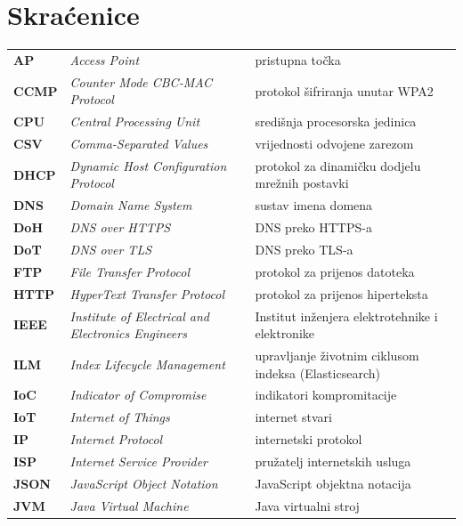 \documentclass[diplomskirad]{fer}
\renewcommand\thepage{}
\begin{document}
\tableofcontents
\newpage
\mainmatter
\setcounter{page}{1}
\renewcommand\thepage{\arabic{page}}









\newpage
\chapter*{Skraćenice}
\begin{xltabular}{\textwidth}{>{\bfseries}p{0.12\textwidth} >{\itshape}p{0.42\textwidth} X}
  AP & Access Point & pristupna točka \\
  CCMP & Counter Mode CBC-MAC Protocol & protokol šifriranja unutar WPA2 \\
  CPU & Central Processing Unit & središnja procesorska jedinica \\
  CSV & Comma-Separated Values & vrijednosti odvojene zarezom \\
  DHCP & Dynamic Host Configuration Protocol & protokol za dinamičku dodjelu mrežnih postavki \\
  DNS & Domain Name System & sustav imena domena \\
  DoH & DNS over HTTPS & DNS preko HTTPS-a \\
  DoT & DNS over TLS & DNS preko TLS-a \\
  FTP & File Transfer Protocol & protokol za prijenos datoteka \\
  HTTP & HyperText Transfer Protocol & protokol za prijenos hiperteksta \\
  IEEE & Institute of Electrical and Electronics Engineers & Institut inženjera elektrotehnike i elektronike \\
  ILM & Index Lifecycle Management & upravljanje životnim ciklusom indeksa (Elasticsearch) \\
  IoC & Indicator of Compromise & indikatori kompromitacije \\
  IoT & Internet of Things & internet stvari \\
  IP & Internet Protocol & internetski protokol \\
  ISP & Internet Service Provider & pružatelj internetskih usluga \\
  JSON & JavaScript Object Notation & JavaScript objektna notacija \\
  JVM & Java Virtual Machine & Java virtualni stroj \\

\end{xltabular}
\end{document}
